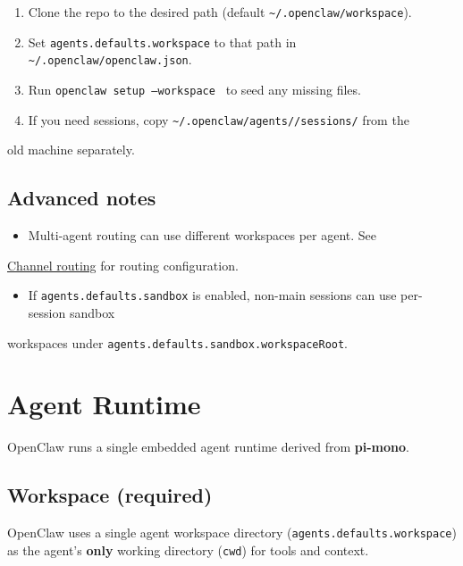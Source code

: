 \begin{enumerate}
  \item Clone the repo to the desired path (default \texttt{\textasciitilde{}/.openclaw/workspace}).
  \item Set \texttt{agents.defaults.workspace} to that path in \texttt{\textasciitilde{}/.openclaw/openclaw.json}.
  \item Run \texttt{openclaw setup --workspace } to seed any missing files.
  \item If you need sessions, copy \texttt{\textasciitilde{}/.openclaw/agents//sessions/} from the
\end{enumerate}

old machine separately.

\subsection{Advanced notes}


\begin{itemize}
  \item Multi-agent routing can use different workspaces per agent. See
\end{itemize}

\href{/channels/channel-routing}{Channel routing} for routing configuration.
\begin{itemize}
  \item If \texttt{agents.defaults.sandbox} is enabled, non-main sessions can use per-session sandbox
\end{itemize}

workspaces under \texttt{agents.defaults.sandbox.workspaceRoot}.


\clearpage

\section{Agent Runtime}


OpenClaw runs a single embedded agent runtime derived from \textbf{pi-mono}.

\subsection{Workspace (required)}


OpenClaw uses a single agent workspace directory (\texttt{agents.defaults.workspace}) as the agent’s \textbf{only} working directory (\texttt{cwd}) for tools and context.

